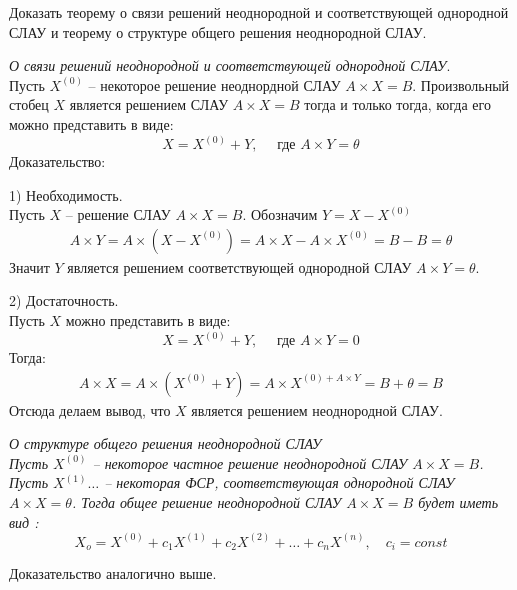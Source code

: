 \begin{question}
  Доказать теорему о связи решений неоднородной и соответствующей однородной СЛАУ и теорему о структуре общего решения неоднородной СЛАУ.
\end{question} 
\begin{answer}
  \textit{О связи решений неоднородной и соответствующей однородной СЛАУ}. \\
  Пусть $X^{(0)}$ -- некоторое решение неоднордной СЛАУ $A \times X = B$. Произвольный стобец $X$ является решением СЛАУ $A \times X = B$ тогда и только тогда, когда его можно представить в виде:  \[
    X = X^{(0)} + Y, \quad \text{ где } A \times Y = \theta
  \] 
  Доказательство:

  1) Необходимость. \\
  Пусть $X$ -- решение СЛАУ $A \times X = B$. Обозначим $Y = X - X^{(0)}$
  \begin{gather*}
    A \times Y = A \times (X - X^{(0)}) = A \times X - A \times X^{(0)} = B - B = \theta
  \end{gather*}
  Значит $Y$ является решением соответствующей однородной СЛАУ  $A \times Y = \theta$.
  
  2) Достаточность. \\
  Пусть $X$ можно представить в виде:  \[
    X = X^{(0)} + Y, \quad \text{ где } A \times Y = 0
  \]
  Тогда:
  \begin{gather*}
  A \times X = A \times (X^{(0)} + Y) = A \times X^{(0) + A \times Y} = B + \theta = B
  \end{gather*}
  Отсюда делаем вывод, что $X$ является решением неоднородной СЛАУ.
\end{answer} 
\nobreakspace
\begin{answer}
    \textit{О структуре общего решения неоднородной СЛАУ\\ 
  Пусть $X^{(0)}$ -- некоторое частное решение неоднородной СЛАУ  $A \times X = B$.
  Пусть  $X^{(1)} \ldots$ -- некоторая ФСР, соответствующая однородной СЛАУ $A \times X=\theta$.
  Тогда общее решение неоднородной СЛАУ $A \times X = B$ будет иметь вид :  \[
    X_o = X^{(0)} + c_1 X^{(1)} + c_2 X^{(2)} + \ldots + c_n X^{(n)}, \quad c_i = const
\]}

Доказательство аналогично выше.
\end{answer} 

